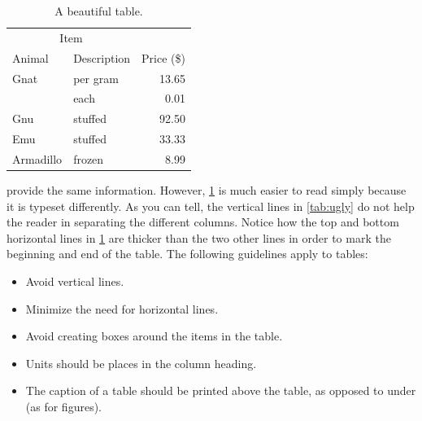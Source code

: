 \begin{table}[H]
	\begin{center}
		\caption{A beautiful table.} \label{tab:beautiful}
		\begin{tabular}{@{}llr@{}} \toprule
			\multicolumn{2}{c}{Item} \\ \cmidrule(r){1-2}
			Animal & Description & Price (\$)\\ \midrule
			Gnat  & per gram  & 13.65 \\
			& each      & 0.01 \\
			Gnu   & stuffed   & 92.50 \\
			Emu   & stuffed   & 33.33 \\
			Armadillo & frozen & 8.99 \\ \bottomrule
		\end{tabular}
	\end{center}
\end{table}
 provide the same information. However, \cref{tab:beautiful} is much easier to read simply because it is typeset differently. As you can tell, the vertical lines in \cref{tab:ugly} do not help the reader in separating the different columns. Notice how the top and bottom horizontal lines in \cref{tab:beautiful} are thicker than the two other lines in order to mark the beginning and end of the table. The following guidelines apply to tables:
\begin{itemize}
	\setlength\itemsep{0em}
	\item Avoid vertical lines.
	\item Minimize the need for horizontal lines.
	\item Avoid creating boxes around the items in the table.
	\item Units should be places in the column heading.
	\item The caption of a table should be printed above the table, as opposed to under (as for figures).
\end{itemize}
